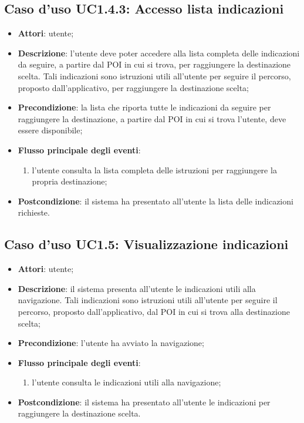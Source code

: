 \documentclass[../AnalisiDeiRequisiti.tex]{subfiles}
\begin{document}
\subsection{Caso d'uso UC1.4.3: Accesso lista indicazioni}
\begin{itemize}
\item \textbf{Attori}: utente;
\item \textbf{Descrizione}: l'utente deve poter accedere alla lista completa delle indicazioni da seguire, a partire dal POI in cui si trova, per raggiungere la destinazione scelta. Tali indicazioni sono istruzioni utili all'utente per seguire il percorso, proposto dall'applicativo, per raggiungere la destinazione scelta; 
      \item \textbf{Precondizione}: la lista che riporta tutte le indicazioni da seguire per raggiungere la destinazione, a partire dal POI in cui si trova l'utente, deve essere disponibile;

        \item \textbf{Flusso principale degli eventi}:
          \begin{enumerate}
          \item l'utente consulta la lista completa delle istruzioni per raggiungere la propria destinazione;

      \end{enumerate}
    \item \textbf{Postcondizione}: il sistema ha presentato all'utente la lista delle indicazioni richieste.
  \end{itemize}
\hypertarget{UC1.5}{}
\subsection{Caso d'uso UC1.5: Visualizzazione indicazioni}

\begin{itemize}
\item \textbf{Attori}: utente;
\item \textbf{Descrizione}: il sistema presenta all'utente le indicazioni utili alla navigazione. Tali indicazioni sono istruzioni utili all'utente per seguire il percorso, proposto dall'applicativo, dal POI in cui si trova alla destinazione scelta; 
      \item \textbf{Precondizione}: l'utente ha avviato la navigazione;

        \item \textbf{Flusso principale degli eventi}:
          \begin{enumerate}
          \item l'utente consulta le indicazioni utili alla navigazione;

      \end{enumerate}

    \item \textbf{Postcondizione}: il sistema ha presentato all'utente le indicazioni per raggiungere la destinazione scelta.
  \end{itemize}
\hypertarget{UC1.6}{}
\end{document}
